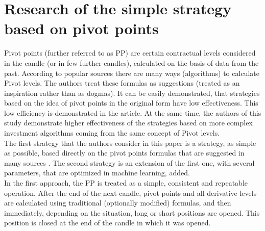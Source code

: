 \documentclass{jtacs}
\begin{document}
\section{Research of the simple strategy based on pivot points}
Pivot points (further referred to as PP) are certain contractual levels considered in the candle (or in few further candles), calculated on the basis of data from the past. According to popular sources \cite{person} \cite{myers} there are many ways (algorithms) to calculate Pivot levels. The authors treat these formulas as suggestions (treated as an inspiration rather than as dogmas). It can be easily demonstrated, that strategies based on the idea of pivot points in the original form have low effectiveness. This low efficiency is demonstrated in the article. At the same time, the authors of this study demonstrate higher effectiveness of the strategies based on more complex investment algorithms coming from the same concept of Pivot levels.\\

The first strategy that the authors consider in this paper is a strategy, as simple as possible, based directly on the pivot points formulas that are suggested in many sources  \cite{person}\cite{myers}\cite{tian}. The second strategy is an extension of the first one, with several parameters, that are optimized in machine learning, added.\\

In the first approach, the PP is treated as a simple, consistent and repeatable operation. After the end of the next candle, pivot points \cite{person} and all derivative levels are calculated using traditional (optionally modified) formulas, and then immediately, depending on the situation, long or short positions are opened. This position is closed at the end of the candle in which it was opened.\\
\end{document}
